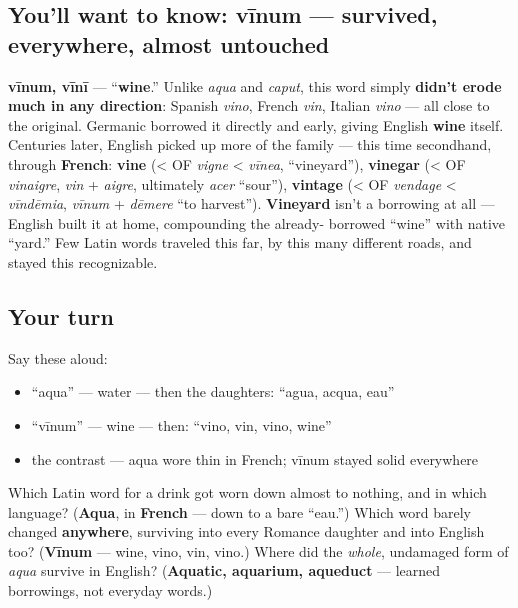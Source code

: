 \subsection*{You'll want to know: vīnum — survived, everywhere, almost untouched}
\textbf{vīnum, vīnī} — \textquotedblleft{}\textbf{wine}.\textquotedblright{} Unlike \emph{aqua} and \emph{caput}, this word simply \textbf{didn't erode much in any direction}: Spanish \emph{vino}, French \emph{vin}, Italian \emph{vino} — all close to the original. Germanic borrowed it directly and early, giving English \textbf{wine} itself. Centuries later, English picked up more of the family — this time secondhand, through \textbf{French}: \textbf{vine} (< OF \emph{vigne} < \emph{vīnea}, \textquotedblleft{}vineyard\textquotedblright{}), \textbf{vinegar} (< OF \emph{vinaigre}, \emph{vin} + \emph{aigre}, ultimately \emph{acer} \textquotedblleft{}sour\textquotedblright{}), \textbf{vintage} (< OF \emph{vendage} < \emph{vīndēmia}, \emph{vīnum} + \emph{dēmere} \textquotedblleft{}to harvest\textquotedblright{}). \textbf{Vineyard} isn't a borrowing at all — English built it at home, compounding the already- borrowed \textquotedblleft{}wine\textquotedblright{} with native \textquotedblleft{}yard.\textquotedblright{} Few Latin words traveled this far, by this many different roads, and stayed this recognizable.

\subsection*{Your turn}
Say these aloud:

\begin{itemize}
\raggedright
  \item \textquotedblleft{}aqua\textquotedblright{} — water — then the daughters: \textquotedblleft{}agua, acqua, eau\textquotedblright{}
  \item \textquotedblleft{}vīnum\textquotedblright{} — wine — then: \textquotedblleft{}vino, vin, vino, wine\textquotedblright{}
  \item the contrast — aqua wore thin in French; vīnum stayed solid everywhere
\end{itemize}

\begin{tcolorbox}[breakable,colback=teal!4,colframe=teal!35!black,title={Before you move on}]
Which Latin word for a drink got worn down almost to nothing, and in which language? (\textbf{Aqua}, in \textbf{French} — down to a bare \textquotedblleft{}eau.\textquotedblright{}) Which word barely changed \textbf{anywhere}, surviving into every Romance daughter and into English too? (\textbf{Vīnum} — wine, vino, vin, vino.) Where did the \emph{whole}, undamaged form of \emph{aqua} survive in English? (\textbf{Aquatic, aquarium, aqueduct} — learned borrowings, not everyday words.)
\end{tcolorbox}
